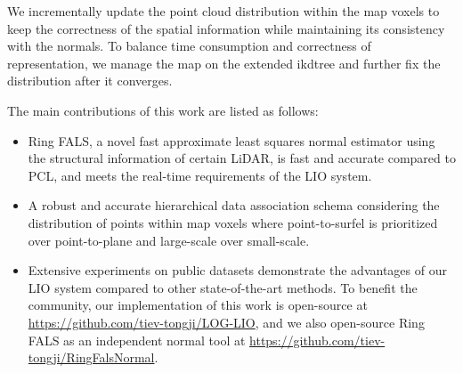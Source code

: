 \documentclass[letterpaper, 10 pt, conference]{ieeeconf}  %
\begin{document}
We incrementally update the point cloud distribution within the map voxels to keep the correctness of the spatial information while maintaining its consistency with the normals.
To balance time consumption and correctness of representation, we manage the map on the extended ikdtree and further fix the distribution after it converges.


The main contributions of this work are listed as follows:
\begin{itemize}
        \item
              Ring FALS, a novel fast approximate least squares normal estimator using the structural information of certain LiDAR, is fast and accurate compared to PCL, and meets the real-time requirements of the LIO system.
        \item
              A robust and accurate hierarchical data association schema considering the distribution of points within map voxels where point-to-surfel is prioritized over point-to-plane and large-scale over small-scale.
        \item
              Extensive experiments on public datasets demonstrate the advantages of our LIO system compared to other state-of-the-art methods.
              To benefit the community, our implementation of this work is open-source at \href{https://github.com/tiev-tongji/LOG-LIO}{https://github.com/tiev-tongji/LOG-LIO}, and we also open-source Ring FALS as an independent normal tool at \href{https://github.com/tiev-tongji/RingFalsNormal}{https://github.com/tiev-tongji/RingFalsNormal}.
\end{itemize}
\end{document}
